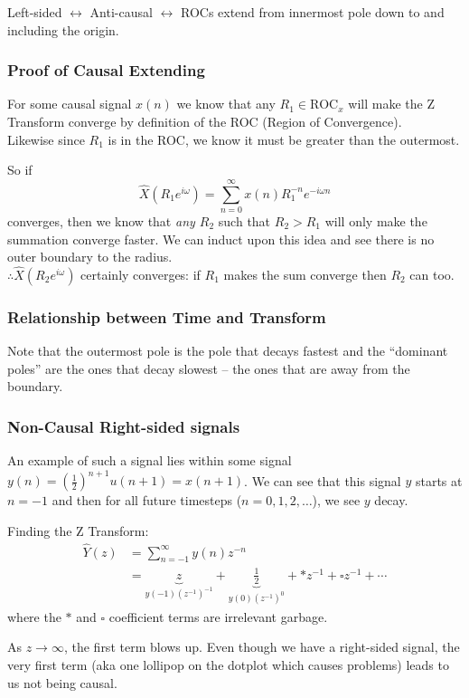 Left-sided $\leftrightarrow$ Anti-causal $\leftrightarrow$ ROCs extend from innermost pole down to and including the origin.

\subsubsection{Proof of Causal Extending}
For some causal signal $x(n)$ we know that any $R_1\in\text{ROC}_x$ will make the Z Transform converge by definition of the ROC (Region of Convergence). \\
Likewise since $R_1$ is in the ROC, we know it must be greater than the outermost.

So if
\[
    \hat X(R_1 e^{i\omega}) = \sum_{n=0}^\infty x(n) R_1^{-n} e^{-i\omega n}
\]
converges, then we know that \textit{any $R_2$} such that $R_2 > R_1$ will only make the summation converge faster. We can induct upon this idea and see there is no outer boundary to the radius.\\
$\therefore \hat X(R_2 e^{i\omega})$ certainly converges: if $R_1$ makes the sum converge then $R_2$ can too.

\subsubsection{Relationship between Time and Transform}
Note that the outermost pole is the pole that decays fastest and the ``dominant poles'' are the ones that decay slowest -- the ones that are away from the boundary. 

\subsubsection{Non-Causal Right-sided signals}
An example of such a signal lies within some signal $y(n)=\left(\frac12\right)^{n+1} u(n+1)=x(n+1)$. We can see that this signal $y$ starts at $n=-1$ and then for all future timesteps ($n=0,1,2,\ldots$), we see $y$ decay.

Finding the Z Transform:
\begin{align*}
    \hat Y(z) 
    &= \sum_{n=-1}^\infty y(n) z^{-n} 
    \\
    &= \underbrace{z}_{y(-1)(z^{-1})^{-1}} + \underbrace{\frac12}_{y(0)(z^{-1})^{0}}
    + \ast z^{-1} + \square z^{-1} + \cdots
\end{align*}
where the $\ast$ and $\square$ coefficient terms are irrelevant garbage.

As $z\to\infty$, the first term blows up. Even though we have a right-sided signal, the very first term (aka one lollipop on the dotplot which causes problems) leads to us not being causal.

